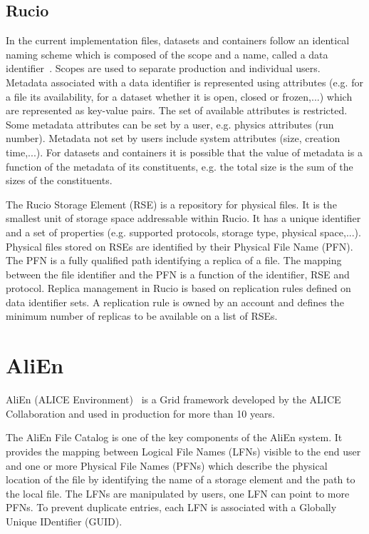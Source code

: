 \subsection{Rucio}
In the current implementation files, datasets and containers follow an identical naming scheme which is composed 
of the scope and a name, called a data identifier~\cite{ATLAS-Rucio}. Scopes are used to separate production and 
individual users. Metadata associated with a data identifier is represented using attributes (e.g. for a file its 
availability, for a dataset whether it is open, closed or frozen,...) which are represented as key-value pairs. 
The set of available attributes is restricted. Some metadata attributes can be set by a user, e.g. physics 
attributes (run number). Metadata not set by users include system attributes (size, creation time,...). 
For datasets and containers it is possible that the value of metadata is a function of the metadata of its
constituents, e.g. the total size is the sum of the sizes of the constituents.

The Rucio Storage Element (RSE) is a repository for physical files. It is the smallest unit of
storage space addressable within Rucio. It has a unique identifier and a set of properties (e.g. supported 
protocols, storage type, physical space,...). Physical files stored on RSEs are identified by their Physical File 
Name (PFN).
The PFN is a fully qualified path identifying a replica of a file. The mapping between the file identifier and
the PFN is a function of the identifier, RSE and protocol. Replica management in Rucio is based on
replication rules defined on data identifier sets. A replication rule is owned by an account and defines the 
minimum number of replicas to be available on a list of RSEs.

\section{AliEn}

AliEn (ALICE Environment)~\cite{AliEn2} is a Grid framework developed by the ALICE
Collaboration and used in production for more than 10 years. 

The AliEn File Catalog is one of the key components of the AliEn system. It
provides the mapping between Logical File Names (LFNs) visible to the end user
and one or more Physical File Names (PFNs) which describe the physical location
of the file by identifying the name of a storage element and the path to the
local file. The LFNs are manipulated by users, one LFN can point to more PFNs.
To prevent duplicate entries, each LFN is associated with a Globally Unique
IDentifier (GUID).

